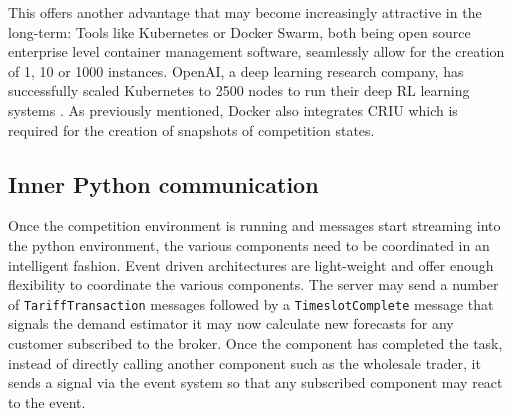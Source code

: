 This offers another advantage that may become increasingly attractive in the long-term: Tools like Kubernetes or Docker Swarm, both being open source enterprise level container management
software, seamlessly allow for the creation of 1, 10 or 1000 instances. OpenAI, a deep learning research company, has
successfully scaled Kubernetes to 2500 nodes to run their deep \ac{RL} learning systems \citep{openai2500}. As
previously mentioned, Docker also integrates \ac{CRIU} which is required for the creation of snapshots of competition
states.


\subsection{Inner Python communication}%
\label{sub:inner_python_communication}

Once the competition environment is running and messages start streaming into the python environment, the various
components need to be coordinated in an intelligent fashion. Event driven architectures are light-weight and offer
enough flexibility to coordinate the various components. The server may send a number of \texttt{TariffTransaction}
messages followed by a \texttt{TimeslotComplete} message that signals the demand estimator it may now calculate new
forecasts for any customer subscribed to the broker. Once the component has completed the task, instead of directly
calling another component such as the wholesale trader, it sends a signal via the event system so that any subscribed
component may react to the event.



